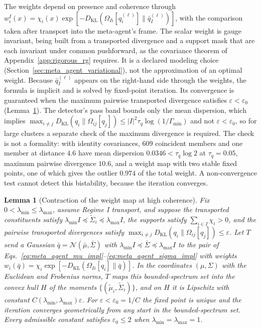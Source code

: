 \documentclass[11pt]{article}
\newtheorem{lemma}{Lemma}
\begin{document}
The weights depend on presence and coherence through $w_i^I(x) = \chi_i(x) \exp[-D_{\mathrm{KL}}(\Omega_{Ii}[q_i^{(\ell)}] \| \bar{q}_I^{(\ell)})]$, with the comparison taken after transport into the meta-agent's frame. The scalar weight is gauge invariant, being built from a transported divergence and a support mask that are each invariant under common pushforward, as the covariance theorem of Appendix~\ref{app:rigorous_rg} requires. It is a declared modeling choice (Section~\ref{sec:meta_agent_variational}), not the approximation of an optimal weight. Because $\bar{q}_I^{(\ell)}$ appears on the right-hand side through the weights, the formula is implicit and is solved by fixed-point iteration. Its convergence is guaranteed when the maximum pairwise transported divergence satisfies $\varepsilon < \varepsilon_0$ (Lemma~\ref{lem:weight_contraction}). The detector's pass band bounds only the mean dispersion, which implies $\max_{i \ne j} D_{\mathrm{KL}}(q_i \| \Omega_{ij}[q_j]) \le |I|^2\tau_q\log(1/\Gamma_{\min})$ and not $\varepsilon < \varepsilon_0$, so for large clusters a separate check of the maximum divergence is required. The check is not a formality: with identity covariances, 609 coincident members and one member at distance $4.6$ have mean dispersion $0.0346 < \tau_q\log 2$ at $\tau_q = 0.05$, maximum pairwise divergence $10.6$, and a weight map with two stable fixed points, one of which gives the outlier $0.974$ of the total weight. A non-convergence test cannot detect this bistability, because the iteration converges.

\begin{lemma}[Contraction of the weight map at high coherence]
\label{lem:weight_contraction}
Fix $0 < \lambda_{\min} \le \lambda_{\max}$, assume Regime I transport, and suppose the transported constituents satisfy $\lambda_{\min} I \preceq \tilde{\Sigma}_i \preceq \lambda_{\max} I$, the supports satisfy $\sum_{i \in I}\chi_i > 0$, and the pairwise transported divergences satisfy $\max_{i \ne j} D_{\mathrm{KL}}(q_i \| \Omega_{ij}[q_j]) \le \varepsilon$. Let $T$ send a Gaussian $\bar{q} = \mathcal{N}(\bar{\mu}, \bar{\Sigma})$ with $\lambda_{\min} I \preceq \bar{\Sigma} \preceq \lambda_{\max} I$ to the pair of Eqs.~\eqref{eq:meta_agent_mu_impl}--\eqref{eq:meta_agent_sigma_impl} with weights $w_i(\bar{q}) = \chi_i \exp[-D_{\mathrm{KL}}(\Omega_{Ii}[q_i] \| \bar{q})]$. In the coordinates $(\mu, \Sigma)$ with the Euclidean and Frobenius norms, $T$ maps this bounded-spectrum set into the convex hull $H$ of the moments $\{(\tilde{\mu}_i, \tilde{\Sigma}_i)\}$, and on $H$ it is Lipschitz with constant $C(\lambda_{\min}, \lambda_{\max})\varepsilon$. For $\varepsilon < \varepsilon_0 = 1/C$ the fixed point is unique and the iteration converges geometrically from any start in the bounded-spectrum set. Every admissible constant satisfies $\varepsilon_0 \le 2$ when $\lambda_{\min} = \lambda_{\max} = 1$.
\end{lemma}
\end{document}

